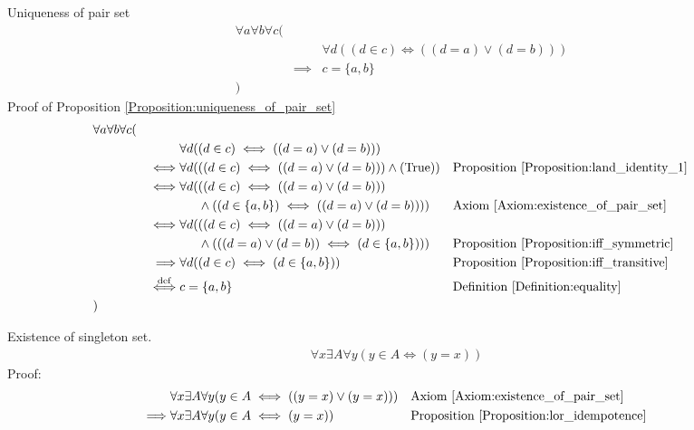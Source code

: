 \begin{prop}
\label{Proposition:uniqueness_of_pair_set}
Uniqueness of pair set
\begin{align*}
& \forall a \forall b \forall c ( \\
& & & \forall d ((d \in c) \iff ((d = a) \lor (d = b))) \\
& & \implies & c = \{ a , b \} \\
& )
\end{align*}
Proof of Proposition \ref{Proposition:uniqueness_of_pair_set}
\begin{align*}
& \forall a \forall b \forall c ( \\
& & & \forall d ((d \in c) \iff ((d = a) \lor (d = b))) \\
& & \iff & \forall d (((d \in c) \iff ((d = a) \lor (d = b))) \land (\text{True}))
&& \text{Proposition \ref{Proposition:land_identity_1}} \\
& & \iff & \forall d (((d \in c) \iff ((d = a) \lor (d = b))) \\
& & & \phantom{\forall d (} \land ((d \in \{ a , b \}) \iff ((d = a) \lor (d = b))))
&& \text{Axiom \ref{Axiom:existence_of_pair_set}} \\
& & \iff & \forall d (((d \in c) \iff ((d = a) \lor (d = b))) \\
& & & \phantom{\forall d (} \land (((d = a) \lor (d = b)) \iff (d \in \{ a , b \})))
&& \text{Proposition \ref{Proposition:iff_symmetric}} \\
& & \implies & \forall d ((d \in c) \iff (d \in \{ a , b \}))
&& \text{Proposition \ref{Proposition:iff_transitive}} \\
& & \overset{\operatorname{def}}{\iff} & c = \{ a , b \}
&& \text{Definition \ref{Definition:equality}} \\
& )
\end{align*}
\end{prop}

\begin{prop}
\label{Proposition:existence_of_singleton_set}
Existence of singleton set.
\begin{align*}
\forall x \exists A \forall y (y \in A \iff (y=x))
\end{align*}
Proof:
\begin{align*}
& \forall x \exists A \forall y (y \in A \iff ((y=x) \lor (y=x)))
&& \text{Axiom \ref{Axiom:existence_of_pair_set}} \\
\implies & \forall x \exists A \forall y (y \in A \iff (y=x))
&& \text{Proposition \ref{Proposition:lor_idempotence}} \
\end{align*}
\end{prop}

